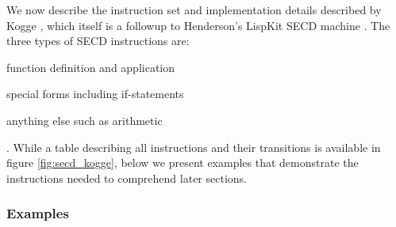 \documentclass[a4paper,12pt,twoside,openright]{report}
\theoremstyle{definition}
\begin{document}
We now describe the instruction set and implementation details described by Kogge \cite{kogge1990architecture}, which itself is a followup to Henderson's LispKit SECD machine \cite{henderson1980functional}. The three types of SECD instructions are:
\begin{enumerate*}[label=(\arabic*)]
    \item function definition and application
    \item special forms including if-statements
    \item anything else such as arithmetic
\end{enumerate*}. While a table describing all instructions and their transitions is available in figure \ref{fig:secd_kogge}, below we present examples that demonstrate the instructions needed to comprehend later sections.

\subsubsection{Examples}\label{ssubsec:secd_example}
\end{document}
